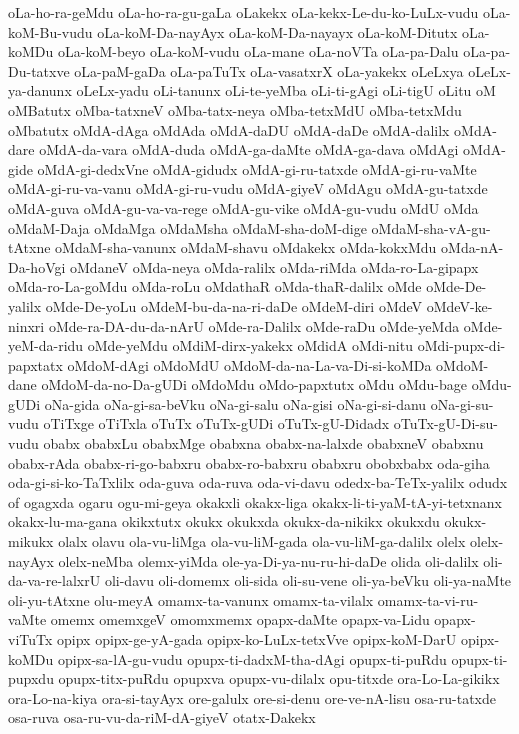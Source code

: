 {oLa-ho-ra-geMdu
oLa-ho-ra-gu-gaLa
oLakekx
oLa-kekx-Le-du-ko-LuLx-vudu
oLa-koM-Bu-vudu
oLa-koM-Da-nayAyx
oLa-koM-Da-nayayx
oLa-koM-Ditutx
oLa-koMDu
oLa-koM-beyo
oLa-koM-vudu
oLa-mane
oLa-noVTa
oLa-pa-Dalu
oLa-pa-Du-tatxve
oLa-paM-gaDa
oLa-paTuTx
oLa-vasatxrX
oLa-yakekx
oLeLxya
oLeLx-ya-danunx
oLeLx-yadu
oLi-tanunx
oLi-te-yeMba
oLi-ti-gAgi
oLi-tigU
oLitu
oM
oMBatutx
oMba-tatxneV
oMba-tatx-neya
oMba-tetxMdU
oMba-tetxMdu
oMbatutx
oMdA-dAga
oMdAda
oMdA-daDU
oMdA-daDe
oMdA-dalilx
oMdA-dare
oMdA-da-vara
oMdA-duda
oMdA-ga-daMte
oMdA-ga-dava
oMdAgi
oMdA-gide
oMdA-gi-dedxVne
oMdA-gidudx
oMdA-gi-ru-tatxde
oMdA-gi-ru-vaMte
oMdA-gi-ru-va-vanu
oMdA-gi-ru-vudu
oMdA-giyeV
oMdAgu
oMdA-gu-tatxde
oMdA-guva
oMdA-gu-va-va-rege
oMdA-gu-vike
oMdA-gu-vudu
oMdU
oMda
oMdaM-Daja
oMdaMga
oMdaMsha
oMdaM-sha-doM-dige
oMdaM-sha-vA-gu-tAtxne
oMdaM-sha-vanunx
oMdaM-shavu
oMdakekx
oMda-kokxMdu
oMda-nA-Da-hoVgi
oMdaneV
oMda-neya
oMda-ralilx
oMda-riMda
oMda-ro-La-gipapx
oMda-ro-La-goMdu
oMda-roLu
oMdathaR
oMda-thaR-dalilx
oMde
oMde-De-yalilx
oMde-De-yoLu
oMdeM-bu-da-na-ri-daDe
oMdeM-diri
oMdeV
oMdeV-ke-ninxri
oMde-ra-DA-du-da-nArU
oMde-ra-Dalilx
oMde-raDu
oMde-yeMda
oMde-yeM-da-ridu
oMde-yeMdu
oMdiM-dirx-yakekx
oMdidA
oMdi-nitu
oMdi-pupx-di-papxtatx
oMdoM-dAgi
oMdoMdU
oMdoM-da-na-La-va-Di-si-koMDa
oMdoM-dane
oMdoM-da-no-Da-gUDi
oMdoMdu
oMdo-papxtutx
oMdu
oMdu-bage
oMdu-gUDi
oNa-gida
oNa-gi-sa-beVku
oNa-gi-salu
oNa-gisi
oNa-gi-si-danu
oNa-gi-su-vudu
oTiTxge
oTiTxla
oTuTx
oTuTx-gUDi
oTuTx-gU-Didadx
oTuTx-gU-Di-su-vudu
obabx
obabxLu
obabxMge
obabxna
obabx-na-lalxde
obabxneV
obabxnu
obabx-rAda
obabx-ri-go-babxru
obabx-ro-babxru
obabxru
obobxbabx
oda-giha
oda-gi-si-ko-TaTxlilx
oda-guva
oda-ruva
oda-vi-davu
odedx-ba-TeTx-yalilx
odudx
of
ogagxda
ogaru
ogu-mi-geya
okakxli
okakx-liga
okakx-li-ti-yaM-tA-yi-tetxnanx
okakx-lu-ma-gana
okikxtutx
okukx
okukxda
okukx-da-nikikx
okukxdu
okukx-mikukx
olalx
olavu
ola-vu-liMga
ola-vu-liM-gada
ola-vu-liM-ga-dalilx
olelx
olelx-nayAyx
olelx-neMba
olemx-yiMda
ole-ya-Di-ya-nu-ru-hi-daDe
olida
oli-dalilx
oli-da-va-re-lalxrU
oli-davu
oli-domemx
oli-sida
oli-su-vene
oli-ya-beVku
oli-ya-naMte
oli-yu-tAtxne
olu-meyA
omamx-ta-vanunx
omamx-ta-vilalx
omamx-ta-vi-ru-vaMte
omemx
omemxgeV
omomxmemx
opapx-daMte
opapx-va-Lidu
opapx-viTuTx
opipx
opipx-ge-yA-gada
opipx-ko-LuLx-tetxVve
opipx-koM-DarU
opipx-koMDu
opipx-sa-lA-gu-vudu
opupx-ti-dadxM-tha-dAgi
opupx-ti-puRdu
opupx-ti-pupxdu
opupx-titx-puRdu
opupxva
opupx-vu-dilalx
opu-titxde
ora-Lo-La-gikikx
ora-Lo-na-kiya
ora-si-tayAyx
ore-galulx
ore-si-denu
ore-ve-nA-lisu
osa-ru-tatxde
osa-ruva
osa-ru-vu-da-riM-dA-giyeV
otatx-Dakekx
}
